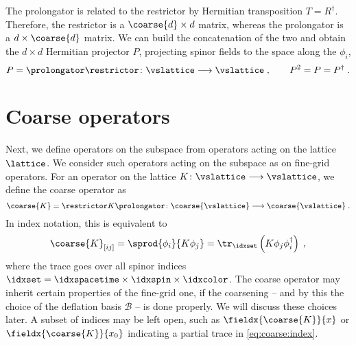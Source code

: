 The prolongator is related to the restrictor by Hermitian transposition $T = R^{\dagger}$.
Therefore, the restrictor is a $\coarse{d} \times d$ matrix, whereas the prolongator is a $d \times \coarse{d}$ matrix.
We can build the concatenation of the two and obtain the $d \times d$ Hermitian projector $P$, projecting spinor fields to the space along the $\phi_{i}$,
\begin{equation} \label{eq:P}
P = \prolongator \restrictor \colon \vslattice \longrightarrow \vslattice \;,
\qquad
P^{2} = P = P^{\dagger} \;.
\end{equation}

\section{Coarse operators}

Next, we define operators on the subspace from operators acting on the lattice $\lattice$.
We consider such operators acting on the subspace as  on fine-grid operators.
For an operator on the lattice $K \colon \vslattice \longrightarrow \vslattice$, we define the coarse operator as
\begin{equation} \label{eq:sd:coarse:op}
\coarse{K} = \restrictor K \prolongator \colon \coarse{\vslattice} \longrightarrow \coarse{\vslattice} \;.
\end{equation}
In index notation, this is equivalent to
\begin{equation} \label{eq:coarse:index}
\coarse{K}_{[i j]} =
\sprod{ \phi_{i} }{ K \phi_{j} } =
\tr_{\idxset} \left( K \phi_j \phi_i^\dagger \right) \;,
\end{equation}
where the trace goes over all spinor indices $\idxset = \idxspacetime \times \idxspin \times \idxcolor$.
The coarse operator may inherit certain properties of the fine-grid one, if the coarsening -- and by this the choice of the deflation basis $\mathcal{B}$ --  is done properly.
We will discuss these choices later.
A subset of indices may be left open, such as $\fieldx{\coarse{K}}{x}$ or $\fieldx{\coarse{K}}{x_0}$ indicating a partial trace in \cref{eq:coarse:index}.

